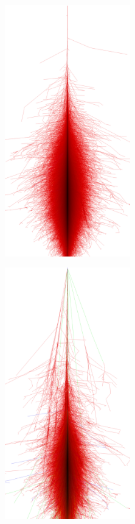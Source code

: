 \begin{figure}
  \centering
  \begin{subfigure}{0.475\textwidth}
    \centering
    \includegraphics[width=0.6\textwidth]{Plots/photon_xz.png}
    \label{fig:proton}
  \end{subfigure}
  \begin{subfigure}{0.475\textwidth}
    \centering
    \includegraphics[width=0.6\textwidth]{Plots/proton_xz.png}

\end{subfigure}
\end{figure}
